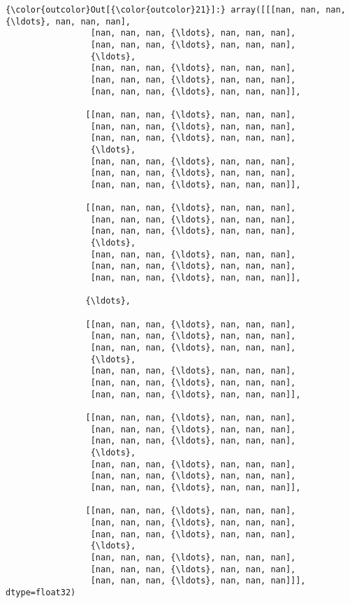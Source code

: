 \documentclass[11pt]{article}
\begin{document}
\begin{Verbatim}[commandchars=\\\{\}]
{\color{outcolor}Out[{\color{outcolor}21}]:} array([[[nan, nan, nan, {\ldots}, nan, nan, nan],
                 [nan, nan, nan, {\ldots}, nan, nan, nan],
                 [nan, nan, nan, {\ldots}, nan, nan, nan],
                 {\ldots},
                 [nan, nan, nan, {\ldots}, nan, nan, nan],
                 [nan, nan, nan, {\ldots}, nan, nan, nan],
                 [nan, nan, nan, {\ldots}, nan, nan, nan]],
         
                [[nan, nan, nan, {\ldots}, nan, nan, nan],
                 [nan, nan, nan, {\ldots}, nan, nan, nan],
                 [nan, nan, nan, {\ldots}, nan, nan, nan],
                 {\ldots},
                 [nan, nan, nan, {\ldots}, nan, nan, nan],
                 [nan, nan, nan, {\ldots}, nan, nan, nan],
                 [nan, nan, nan, {\ldots}, nan, nan, nan]],
         
                [[nan, nan, nan, {\ldots}, nan, nan, nan],
                 [nan, nan, nan, {\ldots}, nan, nan, nan],
                 [nan, nan, nan, {\ldots}, nan, nan, nan],
                 {\ldots},
                 [nan, nan, nan, {\ldots}, nan, nan, nan],
                 [nan, nan, nan, {\ldots}, nan, nan, nan],
                 [nan, nan, nan, {\ldots}, nan, nan, nan]],
         
                {\ldots},
         
                [[nan, nan, nan, {\ldots}, nan, nan, nan],
                 [nan, nan, nan, {\ldots}, nan, nan, nan],
                 [nan, nan, nan, {\ldots}, nan, nan, nan],
                 {\ldots},
                 [nan, nan, nan, {\ldots}, nan, nan, nan],
                 [nan, nan, nan, {\ldots}, nan, nan, nan],
                 [nan, nan, nan, {\ldots}, nan, nan, nan]],
         
                [[nan, nan, nan, {\ldots}, nan, nan, nan],
                 [nan, nan, nan, {\ldots}, nan, nan, nan],
                 [nan, nan, nan, {\ldots}, nan, nan, nan],
                 {\ldots},
                 [nan, nan, nan, {\ldots}, nan, nan, nan],
                 [nan, nan, nan, {\ldots}, nan, nan, nan],
                 [nan, nan, nan, {\ldots}, nan, nan, nan]],
         
                [[nan, nan, nan, {\ldots}, nan, nan, nan],
                 [nan, nan, nan, {\ldots}, nan, nan, nan],
                 [nan, nan, nan, {\ldots}, nan, nan, nan],
                 {\ldots},
                 [nan, nan, nan, {\ldots}, nan, nan, nan],
                 [nan, nan, nan, {\ldots}, nan, nan, nan],
                 [nan, nan, nan, {\ldots}, nan, nan, nan]]], dtype=float32)
\end{Verbatim}
            
\end{document}
